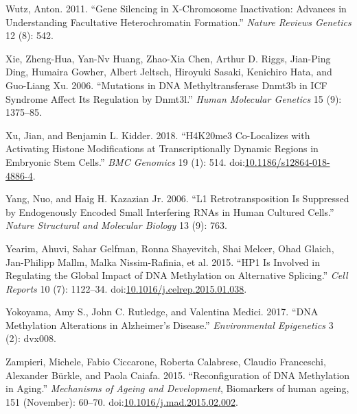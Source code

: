 \documentclass[onehalf,12pt]{beavtex}
\begin{document}
  \hypertarget{ref-WutzGenesilencingXchromosome2011}{}
  Wutz, Anton. 2011. ``Gene Silencing in X-Chromosome Inactivation:
  Advances in Understanding Facultative Heterochromatin Formation.''
  \emph{Nature Reviews Genetics} 12 (8): 542.
  
  \hypertarget{ref-XieMutationsDNAmethyltransferase2006}{}
  Xie, Zheng-Hua, Yan-Nv Huang, Zhao-Xia Chen, Arthur D. Riggs, Jian-Ping
  Ding, Humaira Gowher, Albert Jeltsch, Hiroyuki Sasaki, Kenichiro Hata,
  and Guo-Liang Xu. 2006. ``Mutations in DNA Methyltransferase Dnmt3b in
  ICF Syndrome Affect Its Regulation by Dnmt3l.'' \emph{Human Molecular
  Genetics} 15 (9): 1375--85.
  
  \hypertarget{ref-XuH4K20me3colocalizesactivating2018}{}
  Xu, Jian, and Benjamin L. Kidder. 2018. ``H4K20me3 Co-Localizes with
  Activating Histone Modifications at Transcriptionally Dynamic Regions in
  Embryonic Stem Cells.'' \emph{BMC Genomics} 19 (1): 514.
  doi:\href{https://doi.org/10.1186/s12864-018-4886-4}{10.1186/s12864-018-4886-4}.
  
  \hypertarget{ref-YangL1retrotranspositionsuppressed2006}{}
  Yang, Nuo, and Haig H. Kazazian Jr. 2006. ``L1 Retrotransposition Is
  Suppressed by Endogenously Encoded Small Interfering RNAs in Human
  Cultured Cells.'' \emph{Nature Structural and Molecular Biology} 13 (9):
  763.
  
  \hypertarget{ref-YearimHP1InvolvedRegulating2015}{}
  Yearim, Ahuvi, Sahar Gelfman, Ronna Shayevitch, Shai Melcer, Ohad
  Glaich, Jan-Philipp Mallm, Malka Nissim-Rafinia, et al. 2015. ``HP1 Is
  Involved in Regulating the Global Impact of DNA Methylation on
  Alternative Splicing.'' \emph{Cell Reports} 10 (7): 1122--34.
  doi:\href{https://doi.org/10.1016/j.celrep.2015.01.038}{10.1016/j.celrep.2015.01.038}.
  
  \hypertarget{ref-YokoyamaDNAmethylationalterations2017}{}
  Yokoyama, Amy S., John C. Rutledge, and Valentina Medici. 2017. ``DNA
  Methylation Alterations in Alzheimer's Disease.'' \emph{Environmental
  Epigenetics} 3 (2): dvx008.
  
  \hypertarget{ref-ZampieriReconfigurationDNAmethylation2015}{}
  Zampieri, Michele, Fabio Ciccarone, Roberta Calabrese, Claudio
  Franceschi, Alexander Bürkle, and Paola Caiafa. 2015. ``Reconfiguration
  of DNA Methylation in Aging.'' \emph{Mechanisms of Ageing and
  Development}, Biomarkers of human ageing, 151 (November): 60--70.
  doi:\href{https://doi.org/10.1016/j.mad.2015.02.002}{10.1016/j.mad.2015.02.002}.
  
\end{document}
